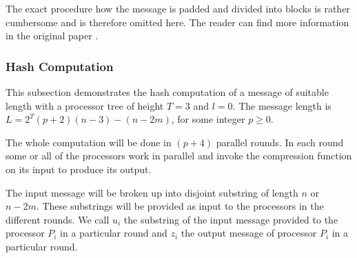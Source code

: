 \documentclass[letterpaper]{article}
\begin{document}
The exact procedure how the message is padded and divided into blocks is rather cumbersome and is therefore omitted here. The reader can find more information in the original paper \cite{parsha256}.


\subsubsection{Hash Computation}\label{parsha-hash}
This subsection demonstrates the hash computation of a message of suitable length with a processor tree of height $T = 3$ and $l = 0$. The message length is $L = 2^T(p+2)(n-3)-(n-2m)$, for some integer $p \geq 0$.


The whole computation will be done in $(p+4)$ parallel rounds. In each round some or all of the processors work in parallel and invoke the compression function on its input to produce its output.

The input message will be broken up into disjoint substring of length $n$ or $n-2m$. These substrings will be provided as input to the processors in the different rounds. We call $u_i$ the substring of the input message provided to the processor $P_i$ in a particular round and $z_i$ the output message of processor $P_i$ in a particular round.
\end{document}
